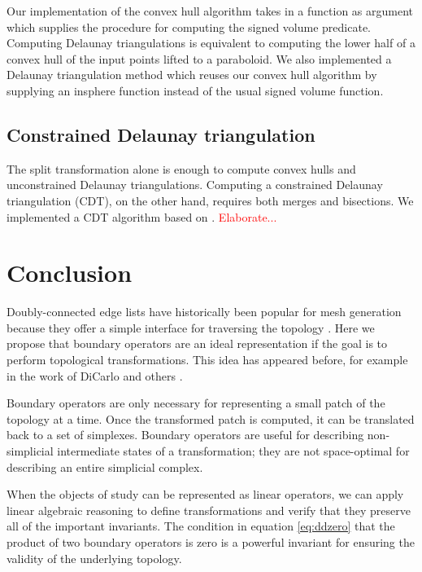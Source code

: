 \documentclass[twocolumn]{article}
\begin{document}
Our implementation of the convex hull algorithm takes in a function as argument which supplies the procedure for computing the signed volume predicate.
Computing Delaunay triangulations is equivalent to computing the lower half of a convex hull of the input points lifted to a paraboloid.
We also implemented a Delaunay triangulation method which reuses our convex hull algorithm by supplying an insphere function instead of the usual signed volume function.


\subsection{Constrained Delaunay triangulation}

The split transformation alone is enough to compute convex hulls and unconstrained Delaunay triangulations.
Computing a constrained Delaunay triangulation (CDT), on the other hand, requires both merges and bisections.
We implemented a CDT algorithm based on \cite{anglada1997improved}.
\textcolor{red}{Elaborate...}


\section{Conclusion}

Doubly-connected edge lists have historically been popular for mesh generation because they offer a simple interface for traversing the topology \cite{guibas1985primitives}.
Here we propose that boundary operators are an ideal representation if the goal is to perform topological transformations.
This idea has appeared before, for example in the work of DiCarlo and others \cite{dicarlo2007solid}.

Boundary operators are only necessary for representing a small patch of the topology at a time.
Once the transformed patch is computed, it can be translated back to a set of simplexes.
Boundary operators are useful for describing non-simplicial intermediate states of a transformation; they are not space-optimal for describing an entire simplicial complex.

When the objects of study can be represented as linear operators, we can apply linear algebraic reasoning to define transformations and verify that they preserve all of the important invariants.
The condition in equation \eqref{eq:ddzero} that the product of two boundary operators is zero is a powerful invariant for ensuring the validity of the underlying topology.



\end{document}
